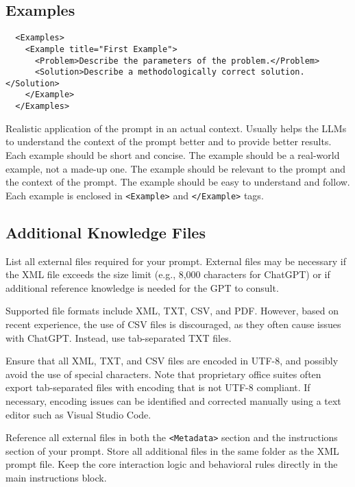 \documentclass[a4paper,11pt]{refart}
\begin{document}
\subsection{Examples}
\begin{lstlisting}
  <Examples>
    <Example title="First Example">
      <Problem>Describe the parameters of the problem.</Problem>
      <Solution>Describe a methodologically correct solution.</Solution>
    </Example>
  </Examples>
\end{lstlisting}
Realistic application of the prompt in an actual context. Usually helps the LLMs to understand the context of the prompt better and to provide better results. Each example should be short and concise. The example should be a real-world example, not a made-up one. The example should be relevant to the prompt and the context of the prompt. The example should be easy to understand and follow. Each example is enclosed in \lstinline!<Example>! and \lstinline!</Example>! tags.

\subsection{Additional Knowledge Files}\label{sec:additional-knowledge-files}
List all external files required for your prompt. External files may be necessary if the XML file exceeds the size limit (e.g., 8,000 characters for ChatGPT) or if additional reference knowledge is needed for the GPT to consult.

Supported file formats include XML, TXT, CSV, and PDF. However, based on recent experience, the use of CSV files is discouraged, as they often cause issues with ChatGPT. Instead, use tab-separated TXT files.

Ensure that all XML, TXT, and CSV files are encoded in UTF-8, and possibly avoid the use of special characters. Note that proprietary office suites often export tab-separated files with encoding that is not UTF-8 compliant. If necessary, encoding issues can be identified and corrected manually using a text editor such as Visual Studio Code.

Reference all external files in both the \lstinline!<Metadata>! section and the instructions section of your prompt. Store all additional files in the same folder as the XML prompt file. Keep the core interaction logic and behavioral rules directly in the main instructions block.
\end{document}
